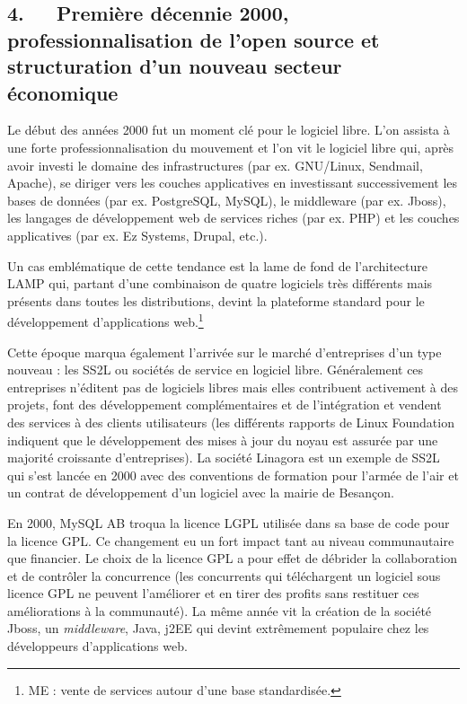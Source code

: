 \documentclass{FramateX}
\begin{document}
\begin{refsection}
\section*{4.~~~Première décennie 2000, professionnalisation de l'open source et structuration d'un nouveau secteur économique}
{}


Le début des années 2000 fut un moment clé pour le logiciel libre.
L'on assista à une forte professionnalisation du
mouvement et l'on vit le logiciel libre qui, après
avoir investi le domaine des infrastructures (par ex. GNU/Linux,
Sendmail, Apache), se diriger vers les couches applicatives en
investissant successivement les bases de données (par ex. PostgreSQL,
MySQL), le middleware (par ex. Jboss), les langages de développement
web de services riches (par ex. PHP) et les couches applicatives (par
ex. Ez Systems, Drupal, etc.).

Un cas emblématique de cette tendance est la lame de fond de
l'architecture LAMP qui, partant d'une combinaison de quatre logiciels
très différents mais présents dans toutes les distributions, devint la
plateforme standard pour le développement d'applications
web.\footnote{ME : vente de services autour d'une base
standardisée.}

Cette époque marqua également l'arrivée sur le marché d'entreprises d'un
type nouveau : les SS2L ou sociétés de service en logiciel libre.
Généralement ces entreprises n'éditent pas de logiciels libres mais
elles contribuent activement à des projets, font des développement
complémentaires et de l'intégration et vendent des services à des
clients utilisateurs (les différents rapports de Linux Foundation
indiquent que le développement des mises à jour du noyau est assurée
par une majorité croissante d'entreprises). La société Linagora est un
exemple de SS2L qui s'est lancée en 2000 avec des conventions de
formation pour l'armée de l'air et un contrat de développement d'un
logiciel avec la mairie de Besançon.

En 2000, MySQL AB troqua la licence LGPL utilisée dans sa base de code
pour la licence GPL. Ce changement eu un fort impact tant au niveau
communautaire que financier. Le choix de la licence GPL a pour effet de
débrider la collaboration et de contrôler la concurrence (les
concurrents qui téléchargent un logiciel sous licence GPL ne peuvent
l'améliorer et en tirer des profits sans restituer ces améliorations à
la communauté). La même année vit la création de la société Jboss, un
\textit{middleware}, Java, j2EE qui devint extrêmement populaire chez
les développeurs d'applications web.


\end{refsection}
\end{document}
